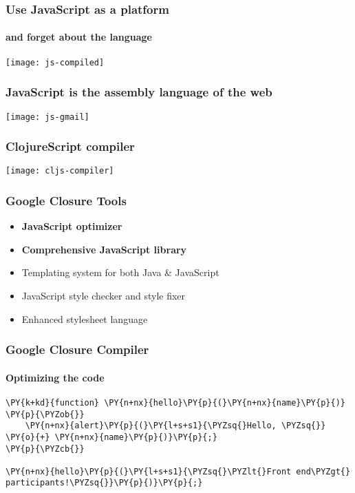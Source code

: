 \begin{frame}
  \frametitle{Use JavaScript as a platform}
  \framesubtitle{and forget about the language}

  \begin{center}
      {\texttt{[image: js-compiled]}}
  \end{center}
\end{frame}


\begin{frame}
  \frametitle{JavaScript is the assembly language of the web}

  \begin{center}
      {\texttt{[image: js-gmail]}}
  \end{center}

\end{frame}


\begin{frame}
  \frametitle{ClojureScript compiler}

  \begin{center}
      {\texttt{[image: cljs-compiler]}}
  \end{center}

\end{frame}


\begin{frame}
  \frametitle{Google Closure Tools}


  \begin{itemize}[<+->]
  \item <1-> \textbf{JavaScript optimizer}
  \item <1-> \textbf{Comprehensive JavaScript library}
  \item <2-> Templating system for both Java \& JavaScript
  \item <2-> JavaScript style checker and style fixer
  \item <2-> Enhanced stylesheet language
  \end{itemize}

\end{frame}


\begin{frame}[fragile]
  \frametitle{Google Closure Compiler}
  \framesubtitle{Optimizing the code}

\begin{Verbatim}[commandchars=\\\{\}]
\PY{k+kd}{function} \PY{n+nx}{hello}\PY{p}{(}\PY{n+nx}{name}\PY{p}{)} \PY{p}{\PYZob{}}
    \PY{n+nx}{alert}\PY{p}{(}\PY{l+s+s1}{\PYZsq{}Hello, \PYZsq{}} \PY{o}{+} \PY{n+nx}{name}\PY{p}{)}\PY{p}{;}
\PY{p}{\PYZcb{}}

\PY{n+nx}{hello}\PY{p}{(}\PY{l+s+s1}{\PYZsq{}\PYZlt{}Front end\PYZgt{} participants!\PYZsq{}}\PY{p}{)}\PY{p}{;}
\end{Verbatim}
\end{frame}


